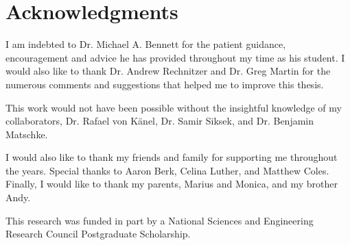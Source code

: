 
\chapter{Acknowledgments}

I am indebted to Dr. Michael A. Bennett for the patient guidance, encouragement and advice he has provided throughout my time as his student. I would also like to thank Dr. Andrew Rechnitzer and Dr. Greg Martin for the numerous comments and suggestions that helped me to improve this thesis. 

This work would not have been possible without the insightful knowledge of my collaborators, Dr. Rafael von K\"anel, Dr. Samir Siksek, and Dr. Benjamin Matschke. 

I would also like to thank my friends and family for supporting me throughout the years. Special thanks to Aaron Berk, Celina Luther, and Matthew Coles. Finally, I would like to thank my parents, Marius and Monica, and my brother Andy. 

This research was funded in part by a National Sciences and Engineering Research Council Postgraduate Scholarship.

\endinput

Thank those people who helped you. 

Don't forget your parents or loved ones.

You may wish to acknowledge your funding sources.
